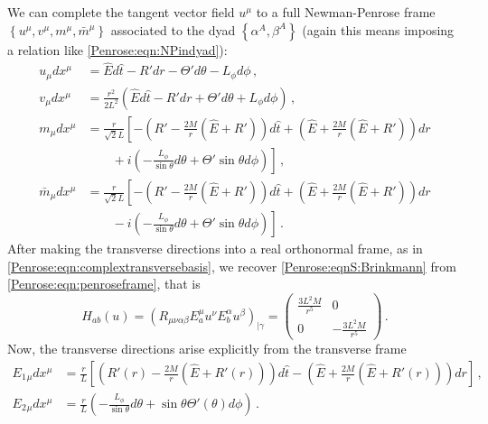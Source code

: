 We can complete the tangent vector field $u^{\mu}$ to a full Newman-Penrose frame $\left\lbrace u^{\mu}, v^{\mu} , m^{\mu} , \bar{m}^{\mu}  \right\rbrace$ associated to the dyad $\left\lbrace \alpha^A, \beta^A \right\rbrace$  (again this means imposing a relation like \eqref{Penrose:eqn:NPindyad}):
\begin{equation}\label{Penrose:eqn:Sframec}
\begin{aligned}
u_{\mu}dx^{\mu} &= \hat{E}d\hat{t} - R' dr - \Theta' d\theta -L_{\phi} d\phi \, , \\
v_{\mu}dx^{\mu} &= \frac{r^2}{2 L^2}\left(\hat{E}d\hat{t} - R' dr + \Theta' d\theta +L_{\phi} d\phi\right)\, , \\
m_{\mu}dx^{\mu} &= \frac{r}{\sqrt{2} L}\left\lbrack -\left( R' -\frac{2M}{r}\left(\hat{E} + R'\right)\right) d\hat{t} + \left( \hat{E} +\frac{2M}{r}\left(\hat{E} + R'\right)\right) dr \right. \\ &\quad \quad + \left. i\left(-\frac{L_{\phi}}{\sin \theta}d\theta+ \Theta' \sin{\theta} d\phi \right) \right\rbrack \, , \\
\bar{m}_{\mu}dx^{\mu} &= \frac{r}{\sqrt{2} L}\left\lbrack -\left( R' -\frac{2M}{r}\left(\hat{E} + R'\right)\right) d\hat{t} + \left( \hat{E} +\frac{2M}{r}\left(\hat{E} + R'\right)\right) dr \right. \\ &\quad \quad - \left. i\left(-\frac{L_{\phi}}{\sin \theta}d\theta + \Theta' \sin{\theta} d\phi \right) \right\rbrack \, .
\end{aligned}
\end{equation}
After making the transverse directions into a real orthonormal frame, as in \eqref{Penrose:eqn:complextransversebasis}, we recover \eqref{Penrose:eqnS:Brinkmann} from \eqref{Penrose:eqn:penroseframe}, that is
\begin{equation}\label{Penrose:eqn:SHframe}
H_{ab}(u) = \left(R_{\mu \nu \alpha \beta} E^{\mu}_a u^{\nu} E^{\alpha}_b u^{\beta} \right)_{|\gamma} = \begin{pmatrix}
\frac{3L^2 M}{r^5} & 0 \\
0 &  -\frac{3L^2 M}{r^5}
\end{pmatrix}\, .
\end{equation}
Now, the transverse directions arise explicitly from the transverse frame
\begin{equation}\label{Penrose:eqn:Sframe}
\begin{aligned}
E_1{}_{\mu}dx^{\mu} &= \frac{r}{L} \left\lbrack \left( R'(r) -\frac{2M}{r}\left(\hat{E} + R'(r)\right)\right) d\hat{t} - \left( \hat{E} +\frac{2M}{r}\left(\hat{E} + R'(r)\right)\right) dr \right\rbrack \, ,\\
E_2{}_{\mu}dx^{\mu} &= \frac{r}{L}\left(-\frac{L_{\phi}}{\sin{\theta}} d\theta +  \sin\theta \Theta'(\theta)d\phi \right)\, .   \\
\end{aligned}
\end{equation}
